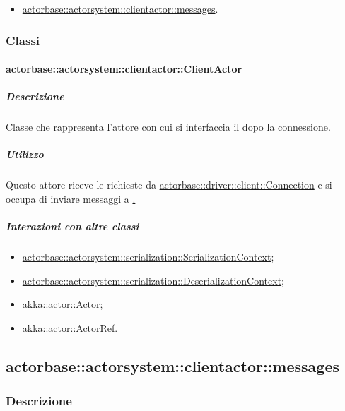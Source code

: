 \documentclass{scalatekids-article}
\begin{document}
\begin{itemize}
\item \hyperref[sec:actorbase::actorsystem::clientactor::messages]{actorbase::actorsystem::clientactor::messages}.
\end{itemize}

\subsubsection{Classi}

\paragraph{actorbase::actorsystem::clientactor::ClientActor}
\label{sec:actorbase::actorsystem::clientactor::ClientActor}

\subparagraph{Descrizione}

Classe che rappresenta l'attore con cui si interfaccia il  dopo
la connessione.

\subparagraph{Utilizzo}

Questo attore riceve le richieste da \hyperref[sec:actorbase::driver::client::Connection]{actorbase::driver::client::Connection}
e si occupa di inviare messaggi a \hyperref[sec:actorbase::actorsystem::main::Main].

\subparagraph{Interazioni con altre classi}

\begin{itemize}
\item \hyperref[sec:actorbase::actorsystem::serialization::SerializationContext]{actorbase::actorsystem::serialization::SerializationContext};
\item \hyperref[sec:actorbase::actorsystem::serialization::DeserializationContext]{actorbase::actorsystem::serialization::DeserializationContext};
\item akka::actor::Actor;
\item akka::actor::ActorRef.
\end{itemize}

\subsection{actorbase::actorsystem::clientactor::messages}
\label{sec:actorbase::actorsystem::clientactor::messages}

\subsubsection{Descrizione}
\end{document}
